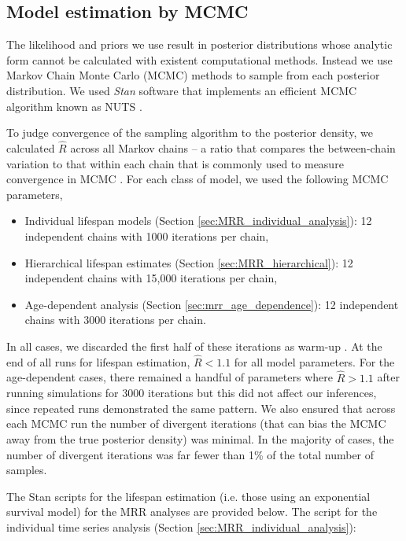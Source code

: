 \documentclass[12pt]{article}
\begin{document}
\subsection{Model estimation by MCMC}\label{sec:mrr_MCMC}
The likelihood and priors we use result in posterior distributions whose analytic form cannot be calculated with existent computational methods. Instead we use Markov Chain Monte Carlo (MCMC) methods to sample from each posterior distribution. We used \textit{Stan} software \citep{carpenter2016stan} that implements an efficient MCMC algorithm known as NUTS \citep{hoffman2014no}.

To judge convergence of the sampling algorithm to the posterior density, we calculated $\hat{R}$ across all Markov chains -- a ratio that compares the between-chain variation to that within each chain that is commonly used to measure convergence in MCMC \citep{gelman1992inference}. For each class of model, we used the following MCMC parameters,
%
\begin{itemize}
	\item Individual lifespan models (Section \ref{sec:MRR_individual_analysis}): 12 independent chains with 1000 iterations per chain,
	\item Hierarchical lifespan estimates (Section \ref{sec:MRR_hierarchical}): 12 independent chains with 15,000 iterations per chain,
	\item Age-dependent analysis (Section \ref{sec:mrr_age_dependence}): 12 independent chains with 3000 iterations per chain.
\end{itemize}

In all cases, we discarded the first half of these iterations as warm-up \citep{gelman2014bayesian}. At the end of all runs for lifespan estimation, $\hat{R}<1.1$ for all model parameters. For the age-dependent cases, there remained a handful of parameters where $\hat{R}>1.1$ after running simulations for 3000 iterations but this did not affect our inferences, since repeated runs demonstrated the same pattern. We also ensured that across each MCMC run the number of divergent iterations (that can bias the MCMC away from the true posterior density) was minimal. In the majority of cases, the number of divergent iterations was far fewer than 1\% of the total number of samples.

The Stan scripts for the lifespan estimation (i.e. those using an exponential survival model) for the MRR analyses are provided below. The script for the individual time series analysis (Section \ref{sec:MRR_individual_analysis}):
\end{document}
